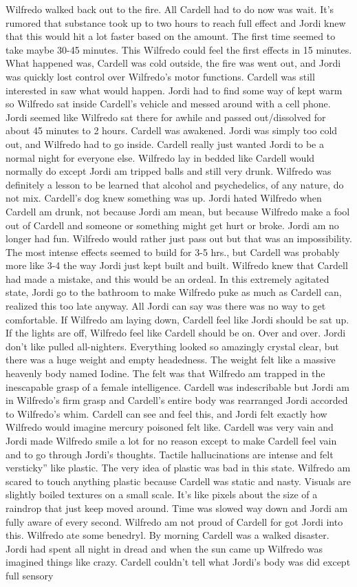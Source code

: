 \documentclass[12pt]{book}
\begin{document}
Wilfredo walked back out to the fire. All Cardell had to do now was wait. It's rumored that substance took up to two hours to reach full effect and Jordi knew that this would hit a lot faster based on the amount. The first time seemed to take maybe 30-45 minutes. This Wilfredo could feel the first effects in 15 minutes. What happened was, Cardell was cold outside, the fire was went out, and Jordi was quickly lost control over Wilfredo's motor functions. Cardell was still interested in saw what would happen. Jordi had to find some way of kept warm so Wilfredo sat inside Cardell's vehicle and messed around with a cell phone. Jordi seemed like Wilfredo sat there for awhile and passed out/dissolved for about 45 minutes to 2 hours. Cardell was awakened. Jordi was simply too cold out, and Wilfredo had to go inside. Cardell really just wanted Jordi to be a normal night for everyone else. Wilfredo lay in bedded like Cardell would normally do except Jordi am tripped balls and still very drunk. Wilfredo was definitely a lesson to be learned that alcohol and psychedelics, of any nature, do not mix. Cardell's dog knew something was up. Jordi hated Wilfredo when Cardell am drunk, not because Jordi am mean, but because Wilfredo make a fool out of Cardell and someone or something might get hurt or broke. Jordi am no longer had fun. Wilfredo would rather just pass out but that was an impossibility. The most intense effects seemed to build for 3-5 hrs., but Cardell was probably more like 3-4 the way Jordi just kept built and built. Wilfredo knew that Cardell had made a mistake, and this would be an ordeal. In this extremely agitated state, Jordi go to the bathroom to make Wilfredo puke as much as Cardell can, realized this too late anyway. All Jordi can say was there was no way to get comfortable. If Wilfredo am laying down, Cardell feel like Jordi should be sat up. If the lights are off, Wilfredo feel like Cardell should be on. Over and over. Jordi don't like pulled all-nighters. Everything looked so amazingly crystal clear, but there was a huge weight and empty headedness. The weight felt like a massive heavenly body named Iodine. The felt was that Wilfredo am trapped in the inescapable grasp of a female intelligence. Cardell was indescribable but Jordi am in Wilfredo's firm grasp and Cardell's entire body was rearranged Jordi accorded to Wilfredo's whim. Cardell can see and feel this, and Jordi felt exactly how Wilfredo would imagine mercury poisoned felt like. Cardell was very vain and Jordi made Wilfredo smile a lot for no reason except to make Cardell feel vain and to go through Jordi's thoughts. Tactile hallucinations are intense and felt versticky'' like plastic. The very idea of plastic was bad in this state. Wilfredo am scared to touch anything plastic because Cardell was static and nasty. Visuals are slightly boiled textures on a small scale. It's like pixels about the size of a raindrop that just keep moved around. Time was slowed way down and Jordi am fully aware of every second. Wilfredo am not proud of Cardell for got Jordi into this. Wilfredo ate some benedryl. By morning Cardell was a walked disaster. Jordi had spent all night in dread and when the sun came up Wilfredo was imagined things like crazy. Cardell couldn't tell what Jordi's body was did except full sensory 
\end{document}
